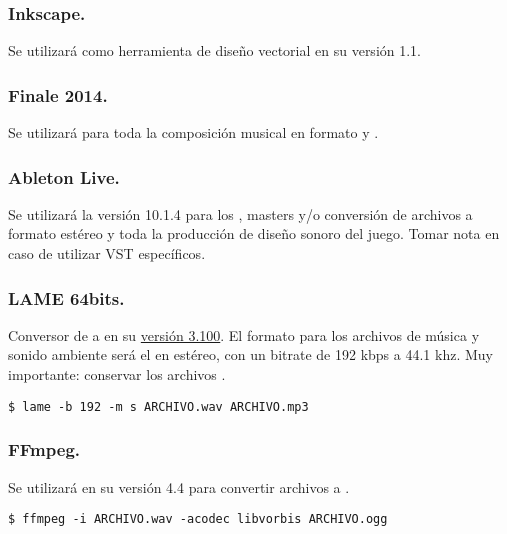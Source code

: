 \subsubsection{Inkscape.}
Se utilizará como herramienta de diseño vectorial en su versión 1.1.

\subsubsection{Finale 2014.}
Se utilizará para toda la composición musical en formato  y .

\subsubsection{Ableton Live.}
Se utilizará la versión 10.1.4 para los , masters y/o conversión de archivos  a formato  estéreo y toda la producción de diseño sonoro del juego. Tomar nota en caso de utilizar VST específicos.

\subsubsection{LAME 64bits.}
Conversor de  a  en su \href{https://lame.sourceforge.io/download.php}{versión 3.100}. El formato para los archivos de música y sonido ambiente será el  en estéreo, con un bitrate de 192 kbps a 44.1 khz. Muy importante: conservar los archivos .

\begin{lstlisting}
$ lame -b 192 -m s ARCHIVO.wav ARCHIVO.mp3
\end{lstlisting}

\subsubsection{FFmpeg.}
Se utilizará en su versión 4.4 para convertir archivos  a .

\begin{lstlisting}
$ ffmpeg -i ARCHIVO.wav -acodec libvorbis ARCHIVO.ogg
\end{lstlisting}